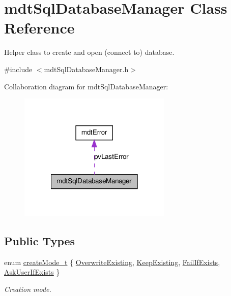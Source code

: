 \hypertarget{classmdt_sql_database_manager}{
\section{mdtSqlDatabaseManager Class Reference}
\label{classmdt_sql_database_manager}
}


Helper class to create and open (connect to) database.  




{\ttfamily \#include $<$mdtSqlDatabaseManager.h$>$}



Collaboration diagram for mdtSqlDatabaseManager:
\nopagebreak
\begin{figure}[H]
\begin{center}
\leavevmode
\includegraphics[width=206pt]{classmdt_sql_database_manager__coll__graph}
\end{center}
\end{figure}
\subsection*{Public Types}
\begin{DoxyCompactItemize}
\item 
enum \hyperlink{classmdt_sql_database_manager_a2f5b46d67a88095053a5edfc415c7418}{createMode\_\-t} \{ \hyperlink{classmdt_sql_database_manager_a2f5b46d67a88095053a5edfc415c7418a4fc53f0ca5f4c3069d1f76363dd1c33d}{OverwriteExisting}, 
\hyperlink{classmdt_sql_database_manager_a2f5b46d67a88095053a5edfc415c7418acc4863e1f1744ee33870efa25d0f4069}{KeepExisting}, 
\hyperlink{classmdt_sql_database_manager_a2f5b46d67a88095053a5edfc415c7418a8ce7ece0b37cefb97d7ebc4ca058691a}{FailIfExists}, 
\hyperlink{classmdt_sql_database_manager_a2f5b46d67a88095053a5edfc415c7418a07472a134a2612efd3b088ab8af78ad6}{AskUserIfExists}
 \}
\begin{DoxyCompactList}\small\item\em Creation mode. \end{DoxyCompactList}\end{DoxyCompactItemize}
